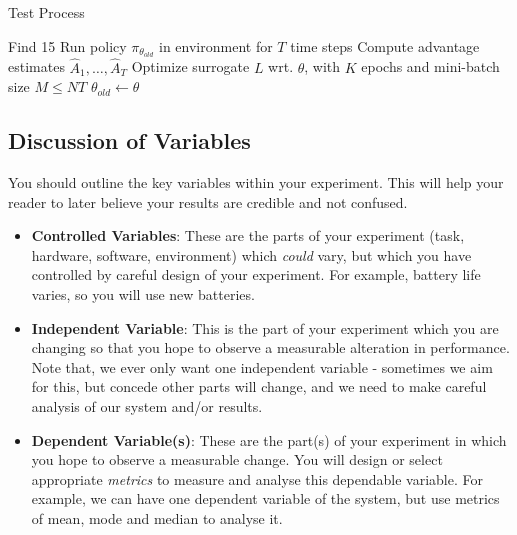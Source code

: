 \documentclass[conference]{IEEEtran}
\begin{document}

\begin{algorithm}
	\caption{Test Process}\label{TestMethod}
	\begin{algorithmic}[1]
        \State Find 15  
				\State Run policy $\pi_{\theta_{old}}$ in environment for $T$ time steps
				\State Compute advantage estimates $\hat{A}_{1},\ldots,\hat{A}_{T}$
			\EndFor
			\State Optimize surrogate $L$ wrt. $\theta$, with $K$ epochs and mini-batch size $M\leq NT$
			\State $\theta_{old}\leftarrow\theta$
		\EndFor
	\end{algorithmic} 
\end{algorithm}

\subsection{Discussion of Variables}
You should outline the key variables within your experiment. This will help your reader to later believe your results are credible and not confused.
\begin{itemize}
    \item \textbf{Controlled Variables}: These are the parts of your experiment (task, hardware, software, environment) which \emph{could} vary, but which you have controlled by careful design of your experiment.  For example, battery life varies, so you will use new batteries.
    \item \textbf{Independent Variable}: This is the part of your experiment which you are changing so that you hope to observe a measurable alteration in performance.  Note that, we ever only want one independent variable - sometimes we aim for this, but concede other parts will change, and we need to make careful analysis of our system and/or results.
    \item \textbf{Dependent Variable(s)}: These are the part(s) of your experiment in which you hope to observe a measurable change.  You will design or select appropriate \emph{metrics} to measure and analyse this dependable variable.  For example, we can have one dependent variable of the system, but use metrics of mean, mode and median to analyse it.
\end{itemize}
\end{document}
